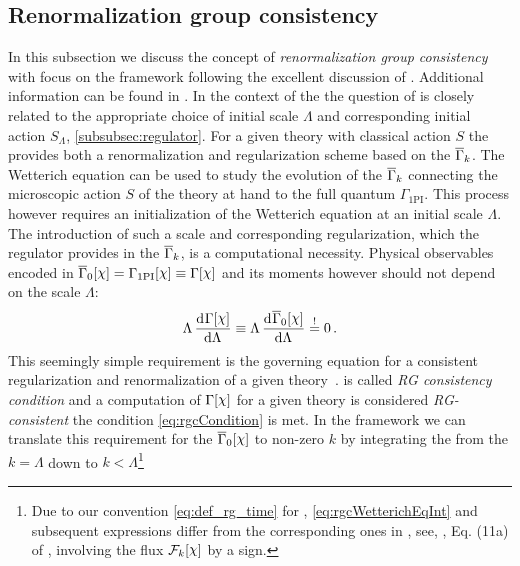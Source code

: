 \subsection{Renormalization group consistency}\label{subsec:RGconsistency}
In this subsection we discuss the concept of \textit{renormalization group consistency} with focus on the \frg{} framework following the excellent discussion of .
Additional information can be found in .
In the context of the \frg{} the question of \rgcy{} is closely related to the appropriate choice of \uv{} initial scale $\Lambda$ and corresponding initial action $S_\Lambda$, \cf{} \cref{subsubsec:regulator}.
For a given theory with classical action $S$ the \frg{} provides both a renormalization and regularization scheme based on the \eaa{} $\overline{\Gamma}_k$.
The Wetterich equation can be used to study the \rgscale{} evolution of the \eaa{} $\overline{\Gamma}_k$ connecting the microscopic action $S$ of the theory at hand to the full quantum \ea{} $\Gamma_\mathrm{1PI}$. 
This process however requires an initialization of the Wetterich equation at an \uv{} initial scale $\Lambda$.
The introduction of such a scale and corresponding regularization, which the regulator provides in the \eaa{} $\overline{\Gamma}_k$, is a computational necessity.
Physical observables encoded in $\FSeaa_0[\FSsf]=\Gamma_\mathrm{1PI}[\FSsf]\equiv\Gamma[\FSsf]$ and its moments however should not depend on the scale $\Lambda$:
\begin{align}
	\Lambda\dod{\Gamma[\FSsf]}{\Lambda}\equiv \Lambda\dod{\FSeaa_0[\FSsf]}{\Lambda}\overset{!}{=} 0\,.
	\label{eq:rgcCondition}
\end{align}
This seemingly simple requirement is the governing equation for a consistent regularization and renormalization of a given theory~\cite{Braun:2018svj}.
 is called \textit{RG consistency condition} and a computation of $\Gamma[\FSsf]$ for a given theory is considered \textit{RG-consistent} \ifandonlyif{} the condition \nolinebreak[3]\eqref{eq:rgcCondition} is met.
In the \frg{} framework we can translate this requirement for the \ir{} \eaa{} $\FSeaa_0[\FSsf]$ to non-zero $k$ by integrating the \frgEquation{} from the \uv{} $k=\Lambda$ down to $k<\Lambda$\footnote{%
	Due to our convention \eqref{eq:def_rg_time} for \rgtime{}, \cref{eq:rgcWetterichEqInt} and subsequent expressions differ from the corresponding ones in , see, \eg{}, Eq. (11a) of , involving the \frg{} flux $\FRGflow_{k}[\FSsf]$ by a sign.%
}
